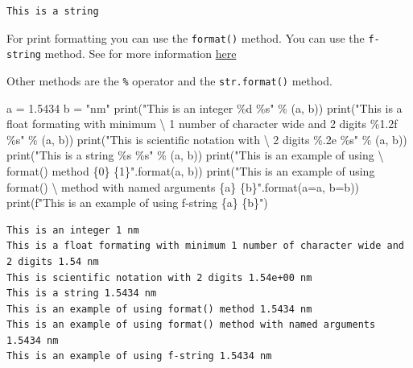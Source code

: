 \documentclass[
  letterpaper,
  DIV=11,
  numbers=noendperiod]{scrreprt}
\newenvironment{Shaded}{\begin{snugshade}}{\end{snugshade}}
\newcommand{\BuiltInTok}[1]{\textcolor[rgb]{0.00,0.23,0.31}{#1}}
\newcommand{\CharTok}[1]{\textcolor[rgb]{0.13,0.47,0.30}{#1}}
\newcommand{\FloatTok}[1]{\textcolor[rgb]{0.68,0.00,0.00}{#1}}
\newcommand{\NormalTok}[1]{\textcolor[rgb]{0.00,0.23,0.31}{#1}}
\newcommand{\OperatorTok}[1]{\textcolor[rgb]{0.37,0.37,0.37}{#1}}
\newcommand{\SpecialCharTok}[1]{\textcolor[rgb]{0.37,0.37,0.37}{#1}}
\newcommand{\SpecialStringTok}[1]{\textcolor[rgb]{0.13,0.47,0.30}{#1}}
\newcommand{\StringTok}[1]{\textcolor[rgb]{0.13,0.47,0.30}{#1}}
\begin{document}
\begin{verbatim}
This is a string
\end{verbatim}

For print formatting you can use the \texttt{format()} method. You can
use the \texttt{f-string} method. See for more information
\href{https://docs.python.org/3/tutorial/inputoutput.html\#tut-f-strings}{here}

Other methods are the \texttt{\%} operator and the \texttt{str.format()}
method.

\begin{Shaded}
\begin{Highlighting}[]
\NormalTok{a }\OperatorTok{=} \FloatTok{1.5434}
\NormalTok{b }\OperatorTok{=} \StringTok{"nm"}
\BuiltInTok{print}\NormalTok{(}\StringTok{"This is an integer }\SpecialCharTok{\%d}\StringTok{ }\SpecialCharTok{\%s}\StringTok{"} \OperatorTok{\%}\NormalTok{ (a, b))}
\BuiltInTok{print}\NormalTok{(}\StringTok{"This is a float formating with minimum }\CharTok{\textbackslash{}}
\StringTok{1 number of character wide and 2 digits }\SpecialCharTok{\%1.2f}\StringTok{ }\SpecialCharTok{\%s}\StringTok{"} \OperatorTok{\%}\NormalTok{ (a, b))}
\BuiltInTok{print}\NormalTok{(}\StringTok{"This is scientific notation with }\CharTok{\textbackslash{}}
\StringTok{2 digits }\SpecialCharTok{\%.2e}\StringTok{ }\SpecialCharTok{\%s}\StringTok{"} \OperatorTok{\%}\NormalTok{ (a, b))}
\BuiltInTok{print}\NormalTok{(}\StringTok{"This is a string }\SpecialCharTok{\%s}\StringTok{ }\SpecialCharTok{\%s}\StringTok{"} \OperatorTok{\%}\NormalTok{ (a, b))}
\BuiltInTok{print}\NormalTok{(}\StringTok{"This is an example of using }\CharTok{\textbackslash{}}
\StringTok{format() method }\SpecialCharTok{\{0\}}\StringTok{ }\SpecialCharTok{\{1\}}\StringTok{"}\NormalTok{.}\BuiltInTok{format}\NormalTok{(a, b)) }
\BuiltInTok{print}\NormalTok{(}\StringTok{"This is an example of using format() }\CharTok{\textbackslash{}}
\StringTok{method with named arguments }\SpecialCharTok{\{a\}}\StringTok{ }\SpecialCharTok{\{b\}}\StringTok{"}\NormalTok{.}\BuiltInTok{format}\NormalTok{(a}\OperatorTok{=}\NormalTok{a, b}\OperatorTok{=}\NormalTok{b))}
\BuiltInTok{print}\NormalTok{(}\SpecialStringTok{f"This is an example of using f{-}string }\SpecialCharTok{\{}\NormalTok{a}\SpecialCharTok{\}}\SpecialStringTok{ }\SpecialCharTok{\{}\NormalTok{b}\SpecialCharTok{\}}\SpecialStringTok{"}\NormalTok{)}
\end{Highlighting}
\end{Shaded}

\begin{verbatim}
This is an integer 1 nm
This is a float formating with minimum 1 number of character wide and 2 digits 1.54 nm
This is scientific notation with 2 digits 1.54e+00 nm
This is a string 1.5434 nm
This is an example of using format() method 1.5434 nm
This is an example of using format() method with named arguments 1.5434 nm
This is an example of using f-string 1.5434 nm
\end{verbatim}
\end{document}
